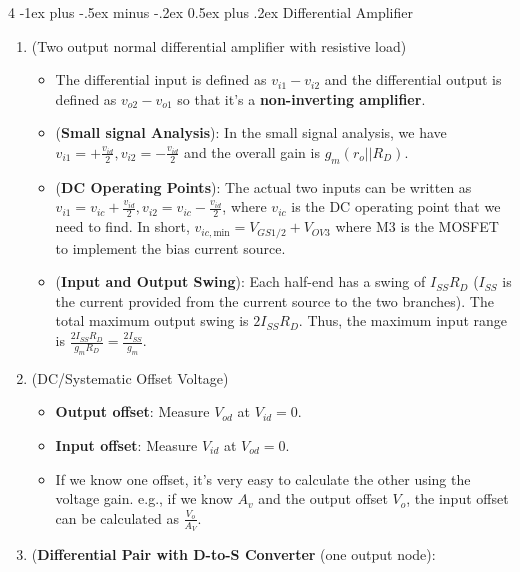 \documentclass[10pt, landscape]{article}
\makeatletter
\renewcommand{\section}{\@startsection{section}{1}{0mm}%
                                {-1ex plus -.5ex minus -.2ex}%
                                {0.5ex plus .2ex}%
                                {\normalfont\large\bfseries}}
\makeatother
\begin{document}
\begin{multicols}{4}
\section{Differential Amplifier}
\begin{enumerate}
    \item (Two output normal differential amplifier with resistive load)
    \begin{itemize}
        \item The differential input is defined as $v_{i1}-v_{i2}$ and the differential output is defined as $v_{o2}-v_{o1}$ so that it's a \textbf{non-inverting amplifier}.
        \item (\textbf{Small signal Analysis}): In the small signal analysis, we have $v_{i1}=+\frac{v_{id}}{2}, v_{i2}=-\frac{v_{id}}{2}$ and the overall gain is $g_m(r_o||R_D)$.
        \item (\textbf{DC Operating Points}): The actual two inputs can be written as $v_{i1}=v_{ic}+\frac{v_{id}}{2}, v_{i2}=v_{ic}-\frac{v_{id}}{2}$, where $v_{ic}$ is the DC operating point that we need to find. In short, $v_{ic,\text{min}}=V_{GS1/2}+V_{OV3}$ where M3 is the MOSFET to implement the bias current source.
        \item (\textbf{Input and Output Swing}): Each half-end has a swing of $I_{SS}R_D$ ($I_{SS}$ is the current provided from the current source to the two branches). The total maximum output swing is $2I_{SS}R_D$. Thus, the maximum input range is $\frac{2I_{SS}R_D}{g_mR_D}=\frac{2I_{SS}}{g_m}$.
    \end{itemize}
    \item (DC/Systematic Offset Voltage)
    \begin{itemize}
        \item \textbf{Output offset}: Measure $V_{od}$ at $V_{id}=0$.
        \item \textbf{Input offset}: Measure $V_{id}$ at $V_{od}=0$.
        \item If we know one offset, it's very easy to calculate the other using the voltage gain. e.g., if we know $A_v$ and the output offset $V_o$, the input offset can be calculated as $\frac{V_o}{A_V}$.
    \end{itemize}
    \item (\textbf{Differential Pair with D-to-S Converter} (one output node): \\

\end{enumerate}
\end{multicols}
\end{document}
